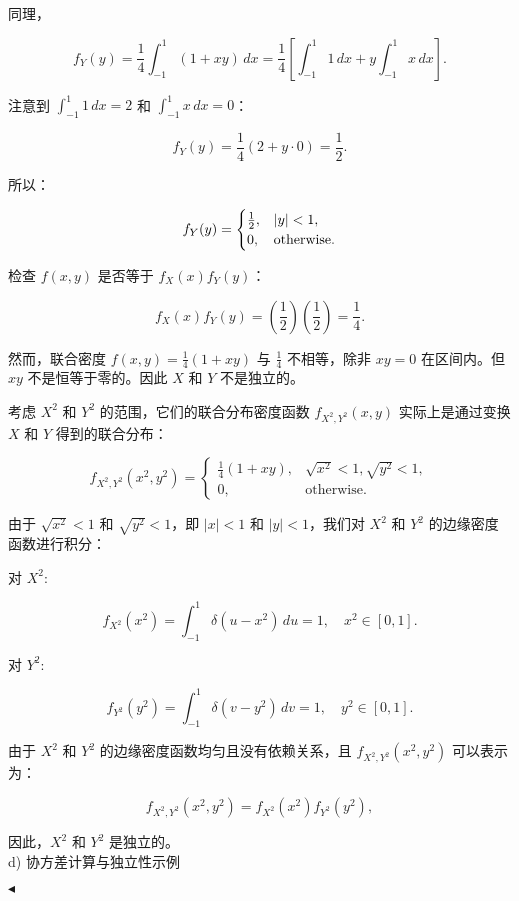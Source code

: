 \documentclass[11pt]{article}
\newenvironment{question}[2][Question]{\begin{trivlist}
\item[\hskip \labelsep {\bfseries #1}\hskip \labelsep {\bfseries #2.}]}{\hfill$\blacktriangleleft$\end{trivlist}}
\begin{document}
\begin{question}{2 (30') (独立性)}
同理，

\[
f_Y(y) = \frac{1}{4} \int_{-1}^{1} (1 + xy) \, dx = \frac{1}{4} \left[ \int_{-1}^{1} 1 \, dx + y \int_{-1}^{1} x \, dx \right].
\]

注意到 \(\int_{-1}^{1} 1 \, dx = 2\) 和 \(\int_{-1}^{1} x \, dx = 0\)：

\[
f_Y(y) = \frac{1}{4} \left( 2 + y \cdot 0 \right) = \frac{1}{2}.
\]

所以：

\[
f_Y(y) = \begin{cases}
\frac{1}{2}, & \abs{y} < 1, \\
0, & \text{otherwise}.
\end{cases}
\]


检查 \( f(x, y) \) 是否等于 \( f_X(x) f_Y(y) \)：

\[
f_X(x) f_Y(y) = \left( \frac{1}{2} \right) \left( \frac{1}{2} \right) = \frac{1}{4}.
\]

然而，联合密度 \( f(x, y) = \frac{1}{4}(1 + xy) \) 与 \(\frac{1}{4}\) 不相等，除非 \( xy = 0 \) 在区间内。但 \( xy \) 不是恒等于零的。因此 \(X\) 和 \(Y\) 不是独立的。


考虑 \( X^2 \) 和 \( Y^2 \) 的范围，它们的联合分布密度函数 \(f_{X^2, Y^2}(x, y)\) 实际上是通过变换 \(X\) 和 \(Y\) 得到的联合分布：

\[
f_{X^2, Y^2}(x^2, y^2) = \begin{cases}
\frac{1}{4}(1 + xy), & \sqrt{x^2} < 1, \sqrt{y^2} < 1, \\
0, & \text{otherwise}.
\end{cases}
\]

由于 \(\sqrt{x^2} < 1\) 和 \(\sqrt{y^2} < 1\)，即 \(|x| < 1\) 和 \(|y| < 1\)，我们对 \(X^2\) 和 \(Y^2\) 的边缘密度函数进行积分：

对 \( X^2 \):

\[
f_{X^2}(x^2) = \int_{-1}^{1} \delta(u - x^2) \, du = 1, \quad x^2 \in [0, 1].
\]

对 \( Y^2 \):

\[
f_{Y^2}(y^2) = \int_{-1}^{1} \delta(v - y^2) \, dv = 1, \quad y^2 \in [0, 1].
\]

由于 \( X^2 \) 和 \( Y^2 \) 的边缘密度函数均匀且没有依赖关系，且 \( f_{X^2, Y^2}(x^2, y^2) \) 可以表示为：

\[
f_{X^2, Y^2}(x^2, y^2) = f_{X^2}(x^2) f_{Y^2}(y^2),
\]

因此，\( X^2 \) 和 \( Y^2 \) 是独立的。\\

 d) 协方差计算与独立性示例



\end{question}
\end{document}
